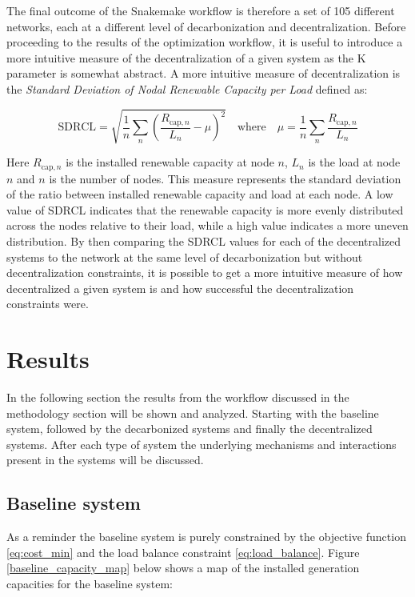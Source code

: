 \documentclass[preprint,12pt,nopreprintline]{elsarticle}
\begin{document}
\medskip
\noindent
The final outcome of the Snakemake workflow is therefore a set of 105 different networks, each at a different level of decarbonization and decentralization. Before proceeding to the results of the optimization workflow, it is useful to introduce a more intuitive measure of the decentralization of a given system as the K parameter is somewhat abstract. A more intuitive measure of decentralization is the \textit{Standard Deviation of Nodal Renewable Capacity per Load} defined as:

\begin{equation}
\text{SDRCL}
=
\sqrt{\frac{1}{n} \sum_{n} \left( \frac{R_{\text{cap},n}}{L_n} - \mu \right)^2}
\quad\text{where}\quad
\mu = \frac{1}{n} \sum_{n} \frac{R_{\text{cap},n}}{L_n}
\label{SDRCL}
\end{equation} 

\medskip
\noindent
Here $R_{\text{cap},n}$ is the installed renewable capacity at node $n$, $L_n$ is the load at node $n$ and $n$ is the number of nodes. This measure represents the standard deviation of the ratio between installed renewable capacity and load at each node. A low value of SDRCL indicates that the renewable capacity is more evenly distributed across the nodes relative to their load, while a high value indicates a more uneven distribution. By then comparing the SDRCL values for each of the decentralized systems to the network at the same level of decarbonization but without decentralization constraints, it is possible to get a more intuitive measure of how decentralized a given system is and how successful the decentralization constraints were.

\newpage
\section{Results}
\noindent
In the following section the results from the workflow discussed in the methodology section will be shown and analyzed. Starting with the baseline system, followed by the decarbonized systems and finally the decentralized systems. After each type of system the underlying mechanisms and interactions present in the systems will be discussed.

\subsection{Baseline system}
\noindent
As a reminder the baseline system is purely constrained by the objective function \eqref{eq:cost_min} and the load balance constraint \eqref{eq:load_balance}. Figure \ref{baseline_capacity_map} below shows a map of the installed generation capacities for the baseline system:
\end{document}
